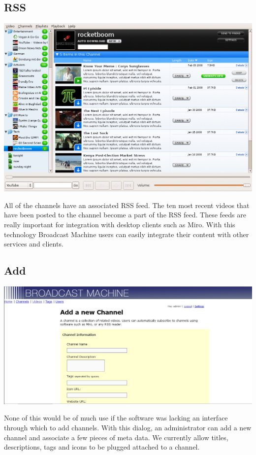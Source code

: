 \documentclass[a4paper,12pt]{report}
\begin{document}
\subsection{RSS}
\includegraphics[width=150mm]{images/channelrss.png}

All of the channels have an associated RSS feed.
The ten most recent videos that have been posted to the channel become a part of the RSS feed.
These feeds are really important for integration with desktop clients such as Miro.
With this technology Broadcast Machine users can easily integrate their content with other services and clients.

\subsection{Add}
\includegraphics[width=150mm]{images/channeladd.png}

None of this would be of much use if the software was lacking an interface through which to add channels.
With this dialog, an administrator can add a new channel and associate a few pieces of meta data.
We currently allow titles, descriptions, tags and icons to be plugged attached to a channel.
\end{document}
